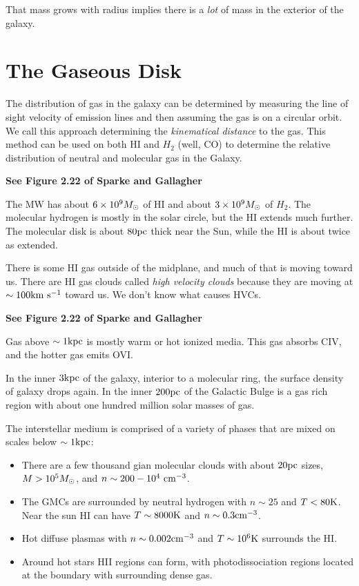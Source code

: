 \documentclass[]{article}
\begin{document}
That mass grows with radius implies there is a {\it lot}
of mass in the exterior of the galaxy.

\section{The Gaseous Disk}

The distribution of gas in the galaxy can be determined by
measuring the line of sight velocity of emission lines and
then assuming the gas is on a circular orbit.  We call this
approach determining the {\it kinematical distance} to the
gas. This method can be used on both HI and $H_2$ (well, CO)
to determine the relative distribution of neutral and molecular
gas in the Galaxy.

{\bf See Figure 2.22 of Sparke and Gallagher}

The MW has about $6\times10^{9}M_{\odot}$ of HI and about 
$3\times10^{9}M_{\odot}$ of $H_2$. The molecular hydrogen
is mostly in the solar circle, but the HI extends much
further.  The molecular disk is about $80\mathrm{pc}$ thick
near the Sun, while the HI is about twice as extended.

There is some HI gas outside of the midplane, and much of
that is moving toward us. There are HI gas clouds called
{\it high velocity clouds} because they are moving
at $\sim100\mathrm{km}~\mathrm{s}^{-1}$ toward us.  We don't know what
causes HVCs.

{\bf See Figure 2.22 of Sparke and Gallagher}

Gas above $\sim1\mathrm{kpc}$ is mostly warm or hot ionized media.
This gas absorbs CIV, and the hotter gas emits OVI.

In the inner $3\mathrm{kpc}$ of the galaxy, interior to a molecular
ring, the surface density of galaxy drops again.  In the
inner $200\mathrm{pc}$ of the Galactic Bulge is a gas rich region
with about one hundred million solar masses of gas.

The interstellar medium is comprised of a variety of
phases that are mixed on scales below $\sim1\mathrm{kpc}$:

\begin{itemize}
\item There are a few thousand gian molecular clouds
with about $20\mathrm{pc}$ sizes, $M>10^{5}M_{\odot}$, and
$n\sim200-10^{4}~\mathrm{cm}^{-3}$.
\item The GMCs are surrounded by neutral hydrogen
with $n\sim25$ and $T<80\mathrm{K}$. Near the sun HI can
have $T\sim8000\mathrm{K}$ and $n\sim0.3\mathrm{cm}^{-3}$.
\item Hot diffuse plasmas with $n\sim0.002\mathrm{cm}^{-3}$
and $T\sim10^{6}\mathrm{K}$ surrounds the HI.
\item Around hot stars HII regions can form, with
photodissociation regions located at the boundary
with surrounding dense gas.
\end{itemize}
\end{document}
